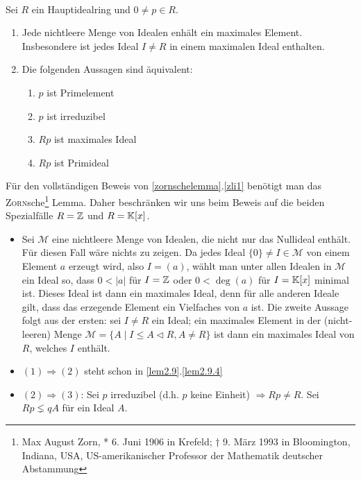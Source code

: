 \begin{mysatz}\label{zornschelemma}\ \medskip

    Sei $R$ ein Hauptidealring und $0 \neq p \in R$.
    \begin{enumerate}
        \item Jede nichtleere Menge von Idealen enhält ein maximales Element. Insbesondere ist jedes Ideal $I \neq R$ in einem maximalen Ideal enthalten. \label{zli1}
        \item Die folgenden Aussagen sind äquivalent:
            \begin{enumerate}
                \item $p$ ist Primelement
                \item $p$ ist irreduzibel
                \item $Rp$ ist maximales Ideal
                \item $Rp$ ist Primideal
            \end{enumerate}
    \end{enumerate}
    Für den vollständigen Beweis von \ref{zornschelemma}.\ref{zli1} benötigt man das \textsc{Zorn}sche\footnote{Max August Zorn, * 6. Juni 1906 in Krefeld; $\dagger$ 9. März 1993 in Bloomington, Indiana, USA, US-amerikanischer Professor der Mathematik deutscher Abstammung} Lemma.
    Daher beschränken wir uns beim Beweis auf die beiden Spezialfälle $R = \mathbb{Z}$ und $R = \mathbb{K}[x]$.
    \begin{itemize}
        \item Sei $\mathcal{M}$ eine nichtleere Menge von Idealen, die nicht nur das Nullideal enthält. Für diesen Fall wäre nichts zu zeigen.
            Da jedes Ideal $\{0\} \neq I\in \mathcal{M}$ von einem Element $a$ erzeugt wird, also $I=(a)$,
            wählt man unter allen Idealen in $\mathcal{M}$ ein Ideal so, dass $0 < |a|$ für $I = \mathbb{Z}$ oder $0 < \deg(a)$ für $I = \mathbb{K}[x]$ minimal ist.
            Dieses Ideal ist dann ein maximales Ideal, denn für alle anderen Ideale gilt, dass das erzegende Element ein Vielfaches von $a$ ist.
            Die zweite Aussage folgt aus der ersten: sei $I \neq R$ ein Ideal; ein maximales Element in der (nicht-leeren) Menge 
            $\mathcal{M} = \{ A \mid I \leq A \lhd R, A \neq R\}$ ist dann ein maximales Ideal von $R$, welches $I$ enthält.
        \item $(1) \Rightarrow (2)$ steht schon in \ref{lem2.9}.\ref{lem2.9.4}
        \item $(2)\Rightarrow(3)$: Sei $p$ irreduzibel (d.h. $p$ keine Einheit) $\Rightarrow Rp \neq R$. Sei $Rp \lneq q A$ für ein Ideal $A$.

\end{itemize}
\end{mysatz}
